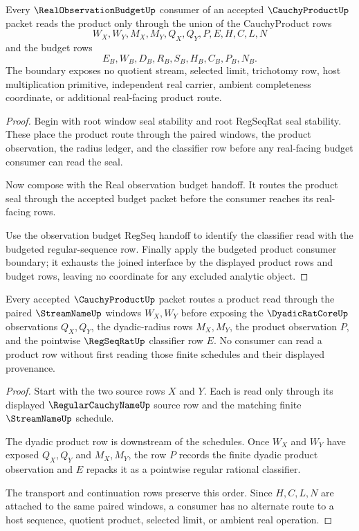 \begin{theorem}
\label{thm:cauchy-product-root-real-budget-seal-boundary}
Every $\RealObservationBudgetUp$ consumer of an accepted $\CauchyProductUp$ packet reads the product only through the union of the CauchyProduct rows
$$
W_X,W_Y,M_X,M_Y,Q_X,Q_Y,P,E,H,C,L,N
$$
and the budget rows
$$
E_B,W_B,D_B,R_B,S_B,H_B,C_B,P_B,N_B.
$$
The boundary exposes no quotient stream, selected limit, trichotomy row, host multiplication primitive, independent real carrier, ambient completeness coordinate, or additional real-facing product route.
\end{theorem}
\begin{proof}
Begin with root window seal stability and root RegSeqRat seal stability. These place the product route through the paired windows, the product observation, the radius ledger, and the classifier row before any real-facing budget consumer can read the seal.

Now compose with the Real observation budget handoff. It routes the product seal through the accepted budget packet before the consumer reaches its real-facing rows.

Use the observation budget RegSeq handoff to identify the classifier read with the budgeted regular-sequence row. Finally apply the budgeted product consumer boundary; it exhausts the joined interface by the displayed product rows and budget rows, leaving no coordinate for any excluded analytic object.
\end{proof}

\begin{theorem}
\label{thm:cauchy-product-streamname-handoff}
Every accepted $\CauchyProductUp$ packet routes a product read through the paired $\StreamNameUp$ windows $W_X,W_Y$ before exposing the $\DyadicRatCoreUp$ observations $Q_X,Q_Y$, the dyadic-radius rows $M_X,M_Y$, the product observation $P$, and the pointwise $\RegSeqRatUp$ classifier row $E$. No consumer can read a product row without first reading those finite schedules and their displayed provenance.
\end{theorem}
\begin{proof}
Start with the two source rows $X$ and $Y$. Each is read only through its displayed $\RegularCauchyNameUp$ source row and the matching finite $\StreamNameUp$ schedule.

The dyadic product row is downstream of the schedules. Once $W_X$ and $W_Y$ have exposed $Q_X,Q_Y$ and $M_X,M_Y$, the row $P$ records the finite dyadic product observation and $E$ repacks it as a pointwise regular rational classifier.

The transport and continuation rows preserve this order. Since $H,C,L,N$ are attached to the same paired windows, a consumer has no alternate route to a host sequence, quotient product, selected limit, or ambient real operation.
\end{proof}

